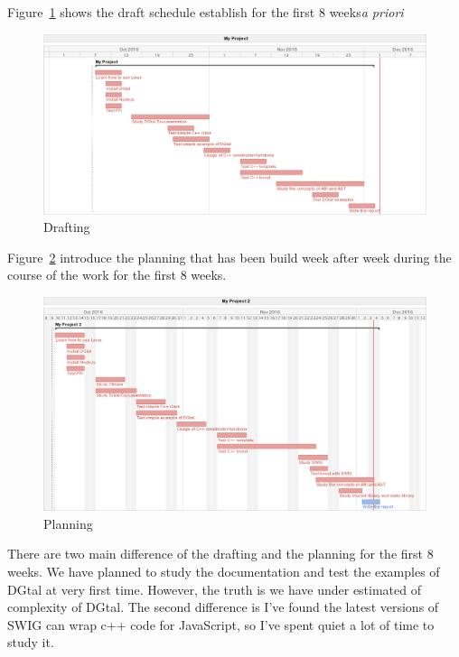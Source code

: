 Figure~\ref{fig:Drafting} shows the draft schedule establish for the first 8 weeks\emph{a priori}

\begin{figure}
   \centering
      
  \includegraphics[scale=0.5]{Images/Gantt1.png}
  
   \caption{Drafting}
   \label{fig:Drafting}
\end{figure}

Figure~\ref{fig:Planning} introduce the planning that has been build week after week during the course of the work for the first 8 weeks.

\begin{figure}
   \centering
      \includegraphics[scale=0.5]{Images/Gantt2.png}
      \caption{Planning}
   \label{fig:Planning}
\end{figure}

There are two main difference of the drafting and the planning for the first 8 weeks. We have planned to study the documentation and test the examples of DGtal at very first time. However, the truth is we have under estimated of complexity of DGtal. The second difference is I've found the latest versions of SWIG can wrap c++ code for JavaScript, so I've spent quiet a lot of time to study it. 


